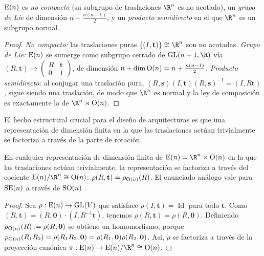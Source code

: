 \begin{proposition}
\label{prop:groups:en-properties}
$\operatorname{E}(n)$ es \emph{no compacto} (su subgrupo de traslaciones $\R^n$ es no
acotado), un \emph{grupo de Lie} de dimensi\'on $n + \tfrac{n(n-1)}{2}$, y un
\emph{producto semidirecto} en el que $\R^n$ es un subgrupo normal.
\end{proposition}

\begin{proof}
\emph{No compacto:} las traslaciones puras $\{(I, \mathbf{t})\} \cong \R^n$ son
no acotadas. \emph{Grupo de Lie:} $\operatorname{E}(n)$ se sumerge como subgrupo cerrado de
$\GL(n+1, \R)$ v\'ia $(R, \mathbf{t}) \mapsto \left(\begin{smallmatrix} R &
\mathbf{t} \\ 0 & 1 \end{smallmatrix}\right)$, de dimensi\'on $n + \dim \operatorname{O}(n) =
n + \tfrac{n(n-1)}{2}$. \emph{Producto semidirecto:} al conjugar una traslaci\'on
pura, $(R, \mathbf{s})(I, \mathbf{t})(R, \mathbf{s})^{-1} = (I, R\mathbf{t})$,
sigue siendo una traslaci\'on, de modo que $\R^n$ es normal y la ley de
composici\'on es exactamente la de $\R^n \rtimes \OO(n)$.
\end{proof}

El hecho estructural crucial para el dise\~no de arquitecturas es que una
representaci\'on de dimensi\'on finita en la que las traslaciones act\'uan
trivialmente se factoriza a trav\'es de la parte de rotaci\'on.

\begin{proposition}
\label{prop:groups:rep-decomposition}
En cualquier representaci\'on de dimensi\'on finita de $\Eucl(n) = \R^n \rtimes
\OO(n)$ en la que las traslaciones act\'uan trivialmente, la representaci\'on se
factoriza a trav\'es del cociente $\Eucl(n)/\R^n \cong \OO(n)$: $\rho(R,
\mathbf{t}) = \rho_{\operatorname{O}(n)}(R)$. El enunciado an\'alogo vale para $\operatorname{SE}(n)$ a
trav\'es de $\operatorname{SO}(n)$ \citep{DBLP:journals/corr/abs-2104-13478}.
\end{proposition}

\begin{proof}
Sea $\rho: \operatorname{E}(n) \to \operatorname{GL}(V)$ que satisface $\rho(I, \mathbf{t}) =
\operatorname{Id}$ para todo $\mathbf{t}$. Como $(R, \mathbf{t}) = (R,
\mathbf{0})\cdot(I, R^{-1}\mathbf{t})$, tenemos $\rho(R, \mathbf{t}) = \rho(R,
\mathbf{0})$. Definiendo $\rho_{\operatorname{O}(n)}(R) := \rho(R, \mathbf{0})$ se obtiene un
homomorfismo, porque $\rho_{\operatorname{O}(n)}(R_1 R_2) = \rho(R_1 R_2, \mathbf{0}) =
\rho(R_1, \mathbf{0}) \rho(R_2, \mathbf{0})$. As\'i, $\rho$ se factoriza a
trav\'es de la proyecci\'on can\'onica $\pi: \Eucl(n) \to \Eucl(n)/\R^n \cong
\OO(n)$.
\end{proof}

